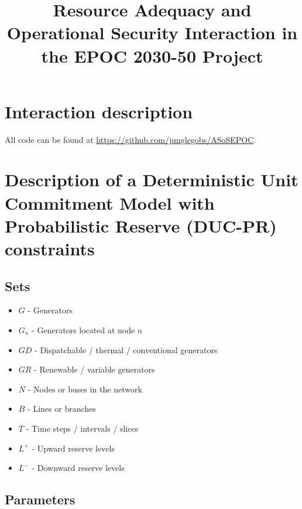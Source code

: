 \documentclass[number,times]{elsarticle}
\begin{document}
\title{Resource Adequacy and Operational Security Interaction in the EPOC 2030-50 Project}

\maketitle

\newpage

\tableofcontents

\newpage

\section{Interaction description}



All code can be found at \href{https://github.com/junglegobs/ASoSEPOC}{https://github.com/junglegobs/ASoSEPOC}.

\section{Description of a Deterministic Unit Commitment Model with Probabilistic Reserve (DUC-PR) constraints}

\subsection{Sets}

\begin{itemize}
    \item $G$ - Generators
    \item $G_n$ - Generators located at node $n$
    \item $GD$ - Dispatchable / thermal / conventional generators
    \item $GR$ - Renewable / variable generators
    \item $N$ - Nodes or buses in the network
    \item $B$ - Lines or branches
    \item $T$ - Time steps / intervals / slices
    \item $L^+$ - Upward reserve levels
    \item $L^-$ - Downward reserve levels
\end{itemize}

\subsection{Parameters}
\end{document}
